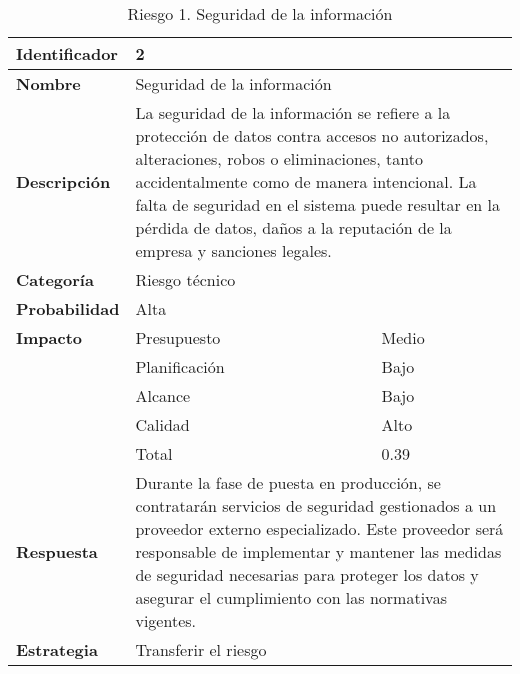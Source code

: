 \begin{table}[H]
    \centering
    \caption{Riesgo 1. Seguridad de la información}
    \label{table:risk_seguridad-informacion}
    \begin{tabular}{>{\columncolor{rowcolor}}l l l}
    \toprule
    \rowcolor{lightgreen}
    \textbf{Identificador} & \multicolumn{2}{l}{2} \\
    \midrule
    \textbf{Nombre} & \multicolumn{2}{l}{Seguridad de la información} \\
    \midrule
    \textbf{Descripción} & \multicolumn{2}{p{10cm}}{La seguridad de la información se refiere a la protección de datos contra accesos no autorizados, alteraciones, robos o eliminaciones, tanto accidentalmente como de manera intencional. La falta de seguridad en el sistema puede resultar en la pérdida de datos, daños a la reputación de la empresa y sanciones legales. } \\
    \midrule
    \textbf{Categoría} & \multicolumn{2}{l}{Riesgo técnico} \\
    \midrule
    \textbf{Probabilidad} & \multicolumn{2}{l}{Alta} \\
    \midrule
    \textbf{Impacto} & Presupuesto & Medio \\
    \cmidrule(lr){2-3}
    & Planificación & Bajo \\
    \cmidrule(lr){2-3}
    & Alcance & Bajo \\
    \cmidrule(lr){2-3}
    & Calidad & Alto \\
    \cmidrule(lr){2-3}
    & Total & 0.39 \\
    \midrule
    \textbf{Respuesta} & \multicolumn{2}{p{10cm}}{Durante la fase de puesta en producción, se contratarán servicios de seguridad gestionados a un proveedor externo especializado. Este proveedor será responsable de implementar y mantener las medidas de seguridad necesarias para proteger los datos y asegurar el cumplimiento con las normativas vigentes.} \\
    \midrule
    \textbf{Estrategia} & \multicolumn{2}{l}{Transferir el riesgo} \\
    \bottomrule
    \end{tabular}
\end{table}


